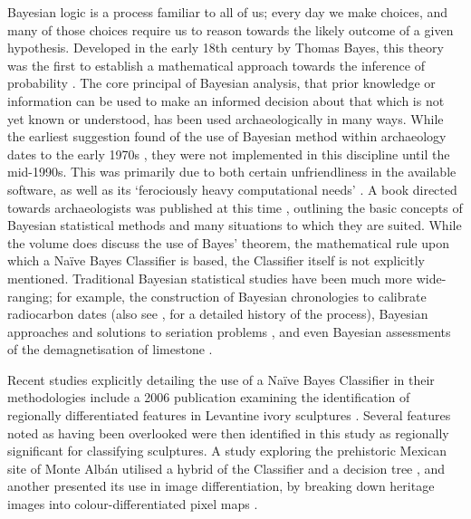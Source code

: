 	Bayesian logic is a process familiar to all of us; every day we make choices, and many of those choices require us to reason towards the likely outcome of a given hypothesis. Developed in the early 18th century by Thomas Bayes, this theory was the first to establish a mathematical approach towards the inference of probability \parencite[2]{Delampady_2003}. The core principal of Bayesian analysis, that prior knowledge or information can be used to make an informed decision about that which is not yet known or understood, has been used archaeologically in many ways. While the earliest suggestion found of the use of Bayesian method within archaeology dates to the early 1970s \parencite[446]{Doran_1972}, they were not implemented in this discipline until the mid-1990s. This was primarily due to both certain unfriendliness in the available software, as well as its ‘ferociously heavy computational needs’ \parencite[139]{Orton_1992}. A book directed towards archaeologists was published at this time \parencite{Buck_1996}, outlining the basic concepts of Bayesian statistical methods and many situations to which they are suited. While the \textcite{Buck_1996} volume does discuss the use of Bayes’ theorem, the mathematical rule upon which a Naïve Bayes Classifier is based, the Classifier itself is not explicitly mentioned. Traditional Bayesian statistical studies have been much more wide-ranging; for example, the construction of Bayesian chronologies to calibrate radiocarbon dates \parencites{Bayliss_2007}{Levy_2010}(also see \textcite{Bayliss_2009}, for a detailed history of the process), Bayesian approaches and solutions to seriation problems \parencite{Halekoh_2004}, and even Bayesian assessments of the demagnetisation of limestone \parencite{Borradaile_2003}.
	
	Recent studies explicitly detailing the use of a Naïve Bayes Classifier in their methodologies include a 2006 publication examining the identification of regionally differentiated features in Levantine ivory sculptures \parencite{Gansell_2006}. Several features noted as having been overlooked were then identified in this study as regionally significant for classifying sculptures. A study exploring the prehistoric Mexican site of Monte Albán utilised a hybrid of the Classifier and a decision tree \parencite{Reynolds_2008}, and another presented its use in image differentiation, by breaking down heritage images into colour-differentiated pixel maps \parencite{Polpinij_2010}.
	
